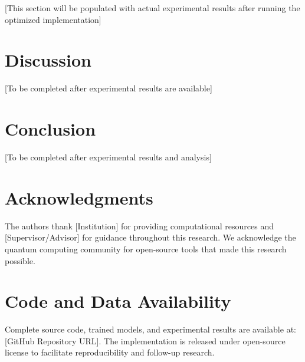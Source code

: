 \documentclass[conference]{IEEEtran}
\begin{document}
[This section will be populated with actual experimental results after running the optimized implementation]

\section{Discussion}
\label{sec:discussion}

[To be completed after experimental results are available]

\section{Conclusion}
\label{sec:conclusion}

[To be completed after experimental results and analysis]

\section{Acknowledgments}

The authors thank [Institution] for providing computational resources and [Supervisor/Advisor] for guidance throughout this research. We acknowledge the quantum computing community for open-source tools that made this research possible.

\section{Code and Data Availability}

Complete source code, trained models, and experimental results are available at: [GitHub Repository URL]. The implementation is released under open-source license to facilitate reproducibility and follow-up research.
\end{document}
